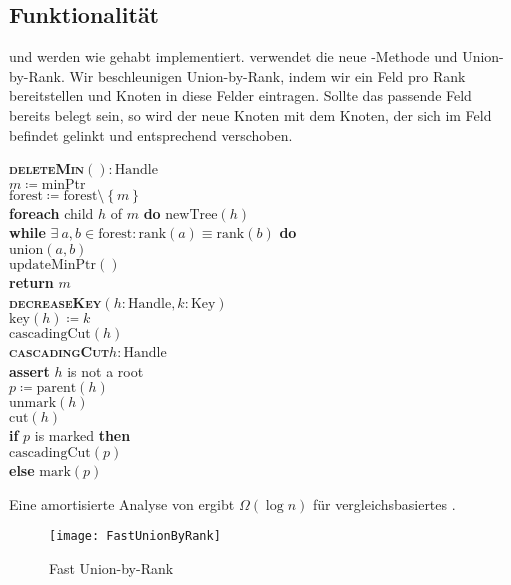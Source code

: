\subsection{Funktionalität}

 und  werden wie gehabt implementiert.  verwendet die neue -Methode und  Union-by-Rank. Wir beschleunigen Union-by-Rank, indem wir ein Feld pro Rank bereitstellen und Knoten in diese Felder eintragen. Sollte das passende Feld bereits belegt sein, so wird der neue Knoten mit dem Knoten, der sich im Feld befindet gelinkt und entsprechend verschoben.

\begin{minipage}{.625\textwidth}
  \begin{pseudocode}
    \textbf{\textsc{deleteMin}}\( () : \text{Handle} \) \\
    \phantom{\enskip} \( m \coloneqq \text{minPtr} \) \\
    \phantom{\enskip} \( \text{forest} \coloneqq \text{forest} \setminus \left \{ m \right \} \) \\
    \phantom{\enskip} \textbf{foreach} child \( h \) of \( m \) \textbf{do} \( \text{newTree}(h) \) \\
    \phantom{\enskip} \textbf{while} \( \exists \ a,b \in \text{forest} : \text{rank}(a) \equiv \text{rank}(b) \) \textbf{do} \\
    \phantom{\enskip} \phantom{\enskip} \( \text{union}(a,b) \) \\
    \phantom{\enskip} \( \text{updateMinPtr}() \) \\
    \phantom{\enskip} \textbf{return} \( m \) \\
    \textbf{\textsc{decreaseKey}}\( (h: \text{Handle}, k : \text{Key}) \) \\
    \phantom{\enskip} \( \text{key}(h) \coloneqq k \) \\
    \phantom{\enskip} \( \text{cascadingCut}(h) \) \\
    \textbf{\textsc{cascadingCut}}\( h : \text{Handle} \) \\
    \phantom{\enskip} \textbf{assert} \( h \) is not a root \\
    \phantom{\enskip} \( p \coloneqq \text{parent}(h) \) \\
    \phantom{\enskip} \( \text{unmark}(h) \) \\
    \phantom{\enskip} \( \text{cut}(h) \) \\
    \phantom{\enskip} \textbf{if} \( p \) is marked \textbf{then} \\
    \phantom{\enskip} \phantom{\enskip} \( \text{cascadingCut}(p) \) \\
    \phantom{\enskip} \textbf{else} \( \text{mark}(p) \)
  \end{pseudocode}
  
  Eine amortisierte Analyse von  ergibt \( \Omega(\log n) \) für vergleichsbasiertes .
\end{minipage}
\hfill
\begin{minipage}{.35\textwidth}
  \begin{figure}[H]
    \texttt{[image: FastUnionByRank]}
    \caption{Fast Union-by-Rank}
  \end{figure}
\end{minipage}